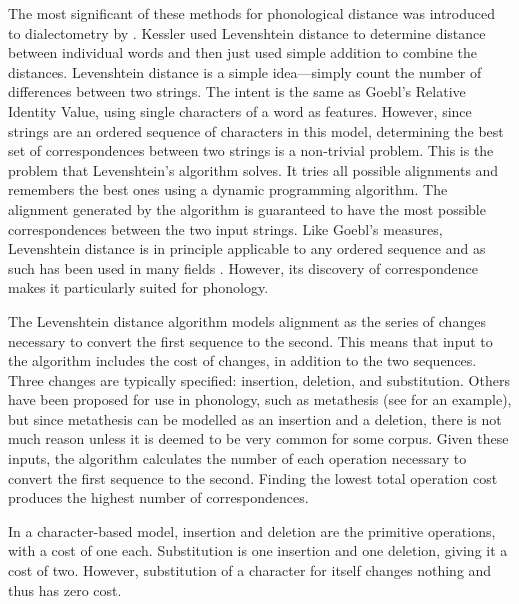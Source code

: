 \documentclass[11pt]{article}
\begin{document}
The most significant of these methods for phonological distance was
introduced to dialectometry by . Kessler used
Levenshtein distance \cite{lev65} to determine distance between
individual words and then just used simple addition to combine the
distances.  Levenshtein distance is a simple idea---simply count the
number of differences between two strings. The intent is the same as
Goebl's Relative Identity Value, using single characters of a word as
features. However, since strings are an ordered sequence of characters
in this model, determining the best set of correspondences between two
strings is a non-trivial problem. This is the problem that
Levenshtein's algorithm solves. It tries all possible alignments and
remembers the best ones using a dynamic programming algorithm. The
alignment generated by the algorithm is guaranteed to have the most
possible correspondences between the two input strings. Like Goebl's
measures, Levenshtein distance is in principle applicable to any
ordered sequence and as such has been used in many fields
\cite{sankoff83}. However, its discovery of correspondence makes it
particularly suited for phonology.

The Levenshtein distance algorithm models alignment
as the series of changes necessary to convert the first sequence to
the second. This means that input to the algorithm includes the cost
of changes, in addition to the two sequences. Three changes are
typically specified: insertion, deletion, and substitution. Others have
been proposed for use in phonology,
such as metathesis (see \cite{kondrak02} for an
example), but since metathesis can be modelled as an insertion and a
deletion, there is not much reason unless it is deemed to be very
common for some corpus.
Given these inputs, the algorithm calculates the number of each
operation necessary to convert the first sequence to the
second. Finding the lowest total operation cost produces the highest number of
correspondences.

In a character-based model, insertion and deletion are the primitive operations,
with a cost of one each. Substitution is one insertion and one
deletion, giving it a cost of two. However, substitution of a character
for itself changes nothing and thus has zero cost.
\end{document}
